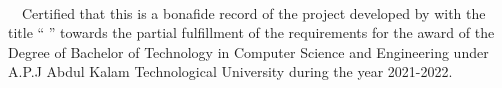 \begin{flushright}
{\myDate}\\ \bigskip                                  
\end{flushright}

\jadafont
  {~~Certified that this  is a bonafide record of the project developed by {\textbf{\memberlist}} with the title ``{{\sc \large  \textbf{\nameOfProject} }}'' towards the partial fulfillment of the requirements for the award of the Degree of Bachelor of Technology in Computer Science and Engineering under A.P.J Abdul Kalam Technological University during the year 2021-2022.}
  
\vfill

\begin{table}[h]
	\centering
\end{table}

\vspace*{1cm}
\parskip 8pt
\clearpage